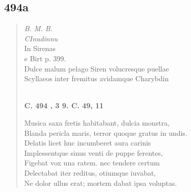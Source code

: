 \documentclass[11pt, a4paper]{report}
\begin{document}
            \subsection*{494a}
      \begin{verse}
      \textit{B. M. B.} \\ \textit{CInudinnu} \\ In Sirenas \\ e Birt p. 399. \\ Dulce malum pelago Siren volucresque puellae \\ Scyllaeos inter fremitus avidamque Charybdin \\ 
        ﻿\pagebreak 
    \begin{center} \textbf{C. 494 , 3 9. C. 49, 11} \end{center} \marginpar{[52]} Musica saxa fretis habitabant, dulcia monstra, \\ Blanda pericla maris, terror quoque gratus in undis. \\ Delatis licet huc incumberet aura carinis \\ Implessentque sinus venti de puppe ferentes, \\ Figebat vox una ratem. nec tendere certum \\ Delectabat iter reditus, otiumque iuvabat, \\ Ne dolor ullus erat; mortem dabat ipsa voluptas. \\ 
      \end{verse}
  
\end{document}
